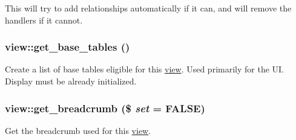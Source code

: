 This will try to add relationships automatically if it can, and will remove the handlers if it cannot. \hypertarget{classview_ae938f5f192743bc0a231e21f60b37383}{
\subsubsection[{get\_\-base\_\-tables}]{\setlength{\rightskip}{0pt plus 5cm}view::get\_\-base\_\-tables ()}}
\label{classview_ae938f5f192743bc0a231e21f60b37383}
Create a list of base tables eligible for this \hyperlink{classview}{view}. Used primarily for the UI. Display must be already initialized. \hypertarget{classview_ac8087bdc827dcf6f79630158f9941260}{
\subsubsection[{get\_\-breadcrumb}]{\setlength{\rightskip}{0pt plus 5cm}view::get\_\-breadcrumb (\$ {\em set} = {\ttfamily FALSE})}}
\label{classview_ac8087bdc827dcf6f79630158f9941260}
Get the breadcrumb used for this \hyperlink{classview}{view}.



